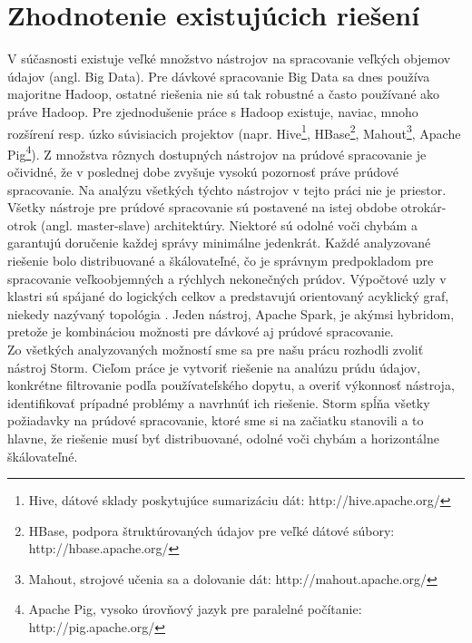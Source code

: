 \section{Zhodnotenie existujúcich riešení}
V súčasnosti existuje veľké množstvo nástrojov na spracovanie veľkých objemov údajov (angl. Big Data). Pre dávkové spracovanie Big Data sa dnes používa majoritne Hadoop, ostatné riešenia nie sú tak robustné a často používané ako práve Hadoop. Pre zjednodušenie práce s Hadoop existuje, naviac, mnoho rozšírení resp. úzko súvisiacich projektov (napr. Hive\footnote{Hive, dátové sklady poskytujúce sumarizáciu dát: http://hive.apache.org/}, HBase\footnote{HBase, podpora štruktúrovaných údajov pre veľké dátové súbory: http://hbase.apache.org/}, Mahout\footnote{Mahout, strojové učenia sa a dolovanie dát: http://mahout.apache.org/}, Apache Pig\footnote{Apache Pig, vysoko úrovňový jazyk pre paralelné počítanie: http://pig.apache.org/}). 
Z množstva rôznych dostupných nástrojov na prúdové spracovanie je očividné, že v poslednej dobe zvyšuje vysokú pozornosť práve prúdové spracovanie. Na analýzu všetkých týchto nástrojov v tejto práci nie je priestor. 
\\[5pt]
Všetky nástroje pre prúdové spracovanie sú postavené na istej obdobe otrokár-otrok (angl. master-slave) architektúry. Niektoré sú odolné voči chybám a garantujú doručenie každej správy minimálne jedenkrát. Každé analyzované riešenie bolo distribuované a škálovateľné, čo je správnym predpokladom pre spracovanie veľkoobjemných a rýchlych nekonečných prúdov. Výpočtové uzly v klastri sú spájané  do logických celkov a predstavujú orientovaný acyklický graf, niekedy nazývaný topológia \citep{toshniwal2014storm}. Jeden nástroj, Apache Spark, je akýmsi hybridom, pretože je kombináciou možnosti pre dávkové aj prúdové spracovanie. 
\\[5pt]
Zo všetkých analyzovaných možností sme sa pre našu prácu rozhodli zvoliť nástroj Storm. Cieľom práce je vytvoriť riešenie na analúzu prúdu údajov, konkrétne filtrovanie podľa používateľského dopytu, a overiť výkonnosť nástroja, identifikovať prípadné problémy a navrhnúť ich riešenie. Storm spĺňa všetky požiadavky na prúdové spracovanie, ktoré sme si na začiatku stanovili a to hlavne, že riešenie musí byť distribuované, odolné voči chybám a horizontálne škálovateľné.














